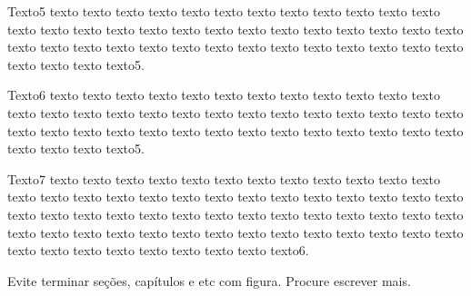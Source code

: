 	\begin{figure}[h!]
		\centering
		\captionsetup{width=14cm}%
	\end{figure}

    Texto5 texto texto texto texto texto texto texto texto texto texto texto texto texto texto texto texto texto texto texto texto texto texto texto texto texto texto texto texto texto texto texto texto texto texto texto texto texto texto texto texto texto texto texto texto5.

    Texto6 texto texto texto texto texto texto texto texto texto texto texto texto texto texto texto texto texto texto texto texto texto texto texto texto texto texto texto texto texto texto texto texto texto texto texto texto texto texto texto texto texto texto texto texto5.

    Texto7 texto texto texto texto texto texto texto texto texto texto texto texto texto texto texto texto texto texto texto texto texto texto texto texto texto texto texto texto texto texto texto texto texto texto texto texto texto texto texto texto texto texto texto texto texto texto texto texto texto texto texto texto texto texto texto texto texto texto texto texto texto texto texto6.

    Evite terminar seções, capítulos e etc com figura. Procure escrever mais.

